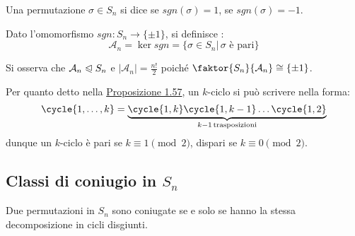 \documentclass[11pt]{scrartcl}
\begin{document}
\begin{definition}
    Una permutazione $\sigma \in S_n$ si dice  se $sgn(\sigma) = 1$,  se $sgn(\sigma) = -1$.
\end{definition}

\begin{definition}
    Dato l'omomorfismo $sgn : S_n \longrightarrow \{\pm 1\}$, si definisce :
        \[ \mathcal{A}_n = \ker sgn = \{\sigma \in S_n |\, \text{$\sigma$ è pari}\}
            \]
\end{definition}

\begin{remark}
    Si osserva che $\mathcal{A}_n \trianglelefteqslant S_n$ e $|\mathcal{A}_n| = \frac{n!}{2}$ poiché $\faktor{S_n}{\mathcal{A}_n} \cong \{\pm 1\}$.
\end{remark}

\begin{remark}
    Per quanto detto nella \hyperref[trasp]{Proposizione 1.57}, un $k$-ciclo si può scrivere nella forma:
        \[ \cycle{1,\ldots,k} = \underbrace{\cycle{1,k}\cycle{1,k-1}\ldots\cycle{1,2}}_{k-1 \, \text{trasposizioni}}
            \]
    dunque un $k$-ciclo è pari se $k \equiv 1 \pmod 2$, dispari se $k \equiv 0 \pmod 2$.
\end{remark}

\pagebreak

\subsection{Classi di coniugio in $S_n$}
\begin{theorem}
    Due permutazioni in $S_n$ sono coniugate se e solo se hanno la stessa decomposizione in cicli disgiunti.
\end{theorem}
\end{document}
